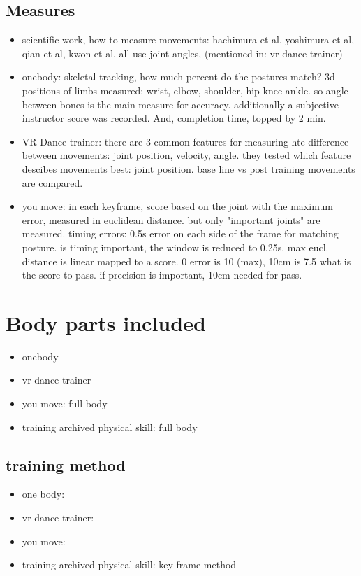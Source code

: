 \subsection{Measures}
\begin{itemize}
	\item scientific work, how to measure movements: hachimura et al, yoshimura et al, qian et al, kwon et al, all use joint angles,  (mentioned in: vr dance trainer)
	\item onebody: skeletal tracking, how much percent do the postures match? 3d positions of limbs measured: wrist, elbow, shoulder, hip knee ankle. so angle between bones is the main measure for accuracy. additionally a subjective instructor score was recorded. And, completion time, topped by 2 min.
	\item VR Dance trainer: there are 3 common features for measuring hte difference between movements: joint position, velocity, angle. they tested which feature descibes movements best: joint position. base line vs post training movements are compared.
	\item you move: in each keyframe, score based on the joint with the maximum error, measured in euclidean distance. but only "important joints" are measured. timing errors: 0.5s error on each side of the frame for matching posture. is timing important, the window is reduced to 0.25s. max eucl. distance is linear mapped to a score. 0 error is 10 (max), 10cm is 7.5 what is the score to pass. if precision is important, 10cm needed for pass.
\end{itemize}
\section{Body parts included}
\begin{itemize}
	\item onebody
	\item vr dance trainer
	\item you move: full body
	\item training archived physical skill: full body
\end{itemize}
\subsection{training method}
\begin{itemize}
	\item one body:
	\item vr dance trainer:
	\item you move: 
	\item training archived physical skill: key frame method
\end{itemize}
